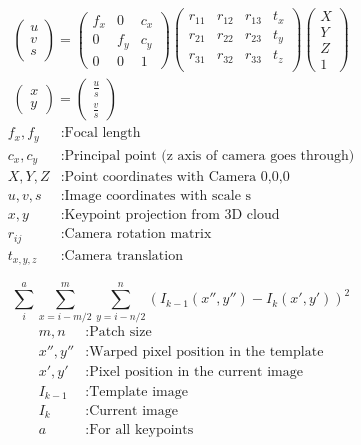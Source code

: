 \documentclass[11pt,a4paper,titlepage,oneside]{report}
\begin{document}
\begin{equation}\label{eq:camera_model}
  \begin{gathered}
    \begin{pmatrix}
      u\\
      v\\
      s
    \end{pmatrix}=
    \begin{pmatrix}
      f_x & 0 & c_x \\
      0 & f_y & c_y \\
      0 & 0 & 1
    \end{pmatrix}
    \begin{pmatrix}
      r_{11} & r_{12} & r_{13} & t_x\\
      r_{21} & r_{22} & r_{23} & t_y\\
      r_{31} & r_{32} & r_{33} & t_z\\
    \end{pmatrix}
    \begin{pmatrix}
      X\\
      Y\\
      Z\\
      1
    \end{pmatrix}\\
    \begin{pmatrix}
      x\\
      y
    \end{pmatrix}=
    \begin{pmatrix}
      \frac{u}{s}\\
      \frac{v}{s}
    \end{pmatrix}
  \end{gathered}
\end{equation}
\begin{align*}
  f_x,f_y  &:  \text{Focal length}\\
  c_x,c_y  &:  \text{Principal point (z axis of camera goes through)}\\
  X,Y,Z     &: \text{Point coordinates with Camera 0,0,0}\\
  u,v,s     &: \text{Image coordinates with scale s}\\
  x,y       &: \text{Keypoint projection from 3D cloud}\\
  r_{ij}    &: \text{Camera rotation matrix}\\
  t_{x,y,z} &: \text{Camera translation}
\end{align*}

\begin{equation}\label{eq:intensity}
	\sum_i^a\sum_{x=i-m/2}^m\sum_{y=i-n/2}^n(I_{k-1}(x'',y'')-I_{k}(x',y'))^2
\end{equation}
\begin{align*}
	m,n				 &: \text{Patch size}\\
  x'',y''    &: \text{Warped pixel position in the template}\\
  x',y'      &: \text{Pixel position in the current image}\\
  I_{k-1}    &: \text{Template image}\\
  I_{k}      &: \text{Current image}\\
  a          &: \text{For all keypoints}  
\end{align*}
\end{document}
